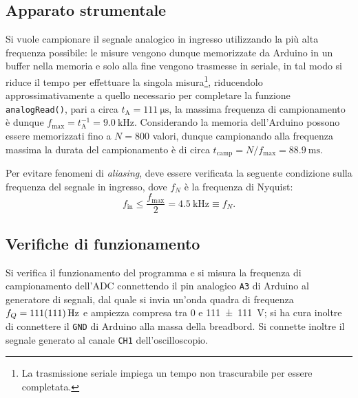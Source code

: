\documentclass[10pt,oneside,a4paper]{article}
\begin{document}
\begin{multicols}{2}
\section{Apparato strumentale}
Si vuole campionare il segnale analogico in ingresso utilizzando la più alta frequenza possibile: le misure vengono dunque memorizzate da Arduino in un buffer nella memoria e solo alla fine vengono trasmesse in seriale, in tal modo si riduce il tempo per effettuare la singola misura\footnote{La trasmissione seriale impiega un tempo non trascurabile per essere completata.}, riducendolo approssimativamente a quello necessario per completare la funzione \texttt{analogRead()}, pari a circa $t_\text{A} = \SI{111}{\micro\second}$, la massima frequenza di campionamento è dunque $f_\text{max} = t_\text{A}^{-1} = \SI{9.0}{\kilo\hertz}$. Considerando la memoria dell'Arduino possono essere memorizzati fino a $N = 800$ valori, dunque campionando alla frequenza massima la durata del campionamento è di circa $t_\text{camp} = N/f_\text{max} = \SI{88.9}{\milli\second}$.

Per evitare fenomeni di \emph{aliasing}, deve essere verificata la seguente condizione sulla frequenza del segnale in ingresso, dove $f_N$ è la frequenza di Nyquist:
\begin{equation}\label{eq:Nyquist}
	f_\text{in} \leq \frac{f_\text{max}}{2} = \SI{4.5}{\kilo\hertz} \equiv f_N.
\end{equation}

\subsection{Verifiche di funzionamento}
Si verifica il funzionamento del programma e si misura la frequenza di campionamento dell'ADC connettendo il pin analogico \texttt{A3} di Arduino al generatore di segnali, dal quale si invia un'onda quadra di frequenza $f_Q = \SI{111 \pm 111}{\Hz}$ e ampiezza compresa tra \SI{0}{} e \SI{111 \pm 111}{V}; si ha cura inoltre di connettere il \texttt{GND} di Arduino alla massa della breadbord. Si connette inoltre il segnale generato al canale \texttt{CH1} dell'oscilloscopio.


\end{multicols}
\end{document}
